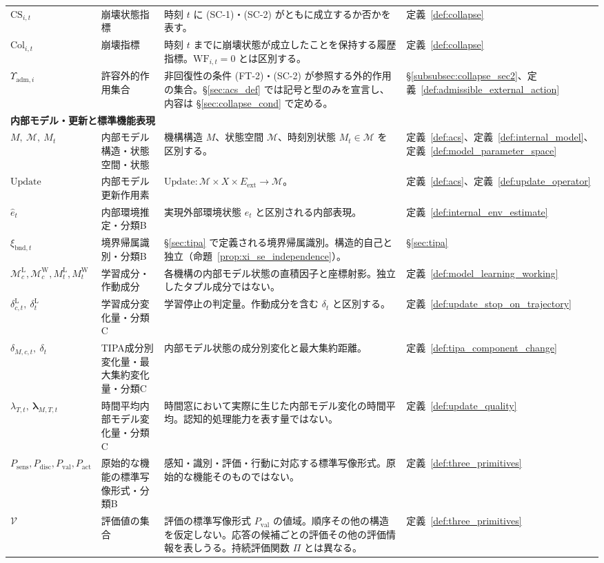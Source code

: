 \begin{longtable}{p{3.0cm} p{3.0cm} p{6.6cm} p{2.0cm}}
$\mathrm{CS}_{i,t}$ & 崩壊状態指標 &
時刻 $t$ に (SC-1)・(SC-2) がともに成立するか否かを表す。 &
定義~\ref{def:collapse} \\[3pt]
$\mathrm{Col}_{i,t}$ & 崩壊指標 &
時刻 $t$ までに崩壊状態が成立したことを保持する履歴指標。$\mathrm{WF}_{i,t}=0$ とは区別する。 &
定義~\ref{def:collapse} \\[3pt]
$\Upsilon_{\mathrm{adm},i}$ & 許容外的作用集合 &
非回復性の条件 (FT-2)・(SC-2) が参照する外的作用の集合。\S\ref{sec:acs_def} では記号と型のみを宣言し、内容は \S\ref{sec:collapse_cond} で定める。 &
\S\ref{subsubsec:collapse_sec2}、定義~\ref{def:admissible_external_action} \\[3pt]
\multicolumn{4}{l}{\textbf{内部モデル・更新と標準機能表現}} \\[2pt]
$M,\ \mathcal M,\ M_t$ & 内部モデル構造・状態空間・状態 &
機構構造 $M$、状態空間 $\mathcal M$、時刻別状態 $M_t\in\mathcal M$ を区別する。 &
定義~\ref{def:acs}、定義~\ref{def:internal_model}、定義~\ref{def:model_parameter_space} \\[3pt]
$\mathrm{Update}$ & 内部モデル更新作用素 &
$\mathrm{Update}:\mathcal M\times X\times E_{\mathrm{ext}}\to\mathcal M$。 &
定義~\ref{def:acs}、定義~\ref{def:update_operator} \\[3pt]
$\hat e_t$ & 内部環境推定・分類B &
実現外部環境状態 $e_t$ と区別される内部表現。 &
定義~\ref{def:internal_env_estimate} \\[3pt]
$\xi_{\mathrm{bnd},t}$ & 境界帰属識別・分類B &
\S\ref{sec:tipa} で定義される境界帰属識別。構造的自己と独立（命題~\ref{prop:xi_se_independence}）。 &
\S\ref{sec:tipa} \\[3pt]
$\mathcal M_c^{\mathrm L}, \mathcal M_c^{\mathrm W}, M_t^{\mathrm L}, M_t^{\mathrm W}$ & 学習成分・作動成分 &
各機構の内部モデル状態の直積因子と座標射影。独立したタプル成分ではない。 &
定義~\ref{def:model_learning_working} \\[3pt]
$\delta^{\mathrm L}_{c,t},\ \delta^{\mathrm L}_t$ & 学習成分変化量・分類C &
学習停止の判定量。作動成分を含む $\delta_t$ と区別する。 &
定義~\ref{def:update_stop_on_trajectory} \\[3pt]
$\delta_{M,c,t},\ \delta_t$ & TIPA成分別変化量・最大集約変化量・分類C &
内部モデル状態の成分別変化と最大集約距離。 &
定義~\ref{def:tipa_component_change} \\[3pt]
$\lambda_{T,t},\ \boldsymbol{\lambda}_{M,T,t}$ & 時間平均内部モデル変化量・分類C &
時間窓において実際に生じた内部モデル変化の時間平均。認知的処理能力を表す量ではない。 &
定義~\ref{def:update_quality} \\[3pt]
$P_{\mathrm{sens}},P_{\mathrm{disc}},P_{\mathrm{val}},P_{\mathrm{act}}$ & 原始的な機能の標準写像形式・分類B &
感知・識別・評価・行動に対応する標準写像形式。原始的な機能そのものではない。 &
定義~\ref{def:three_primitives} \\[3pt]
$\mathcal{V}$ & 評価値の集合 &
評価の標準写像形式 $P_{\mathrm{val}}$ の値域。順序その他の構造を仮定しない。応答の候補ごとの評価その他の評価情報を表しうる。持続評価関数 $\Pi$ とは異なる。 &
定義~\ref{def:three_primitives} \\[3pt]
\end{longtable}
\endgroup


